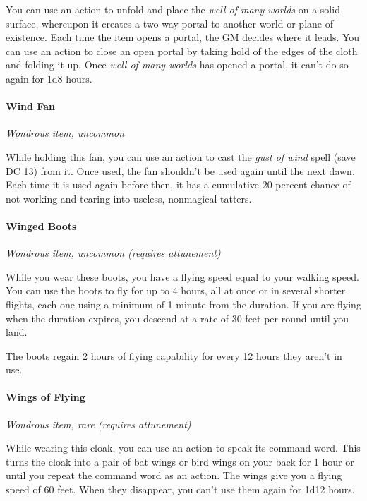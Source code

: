 \documentclass[
]{article}
\begin{document}
You can use an action to unfold and place the \emph{well of many worlds}
on a solid surface, whereupon it creates a two-way portal to another
world or plane of existence. Each time the item opens a portal, the GM
decides where it leads. You can use an action to close an open portal by
taking hold of the edges of the cloth and folding it up. Once \emph{well
of many worlds} has opened a portal, it can't do so again for 1d8 hours.

\hypertarget{wind-fan}{%
\paragraph{Wind Fan}\label{wind-fan}}

\emph{Wondrous item, uncommon}

While holding this fan, you can use an action to cast the \emph{gust of
wind} spell (save DC 13) from it. Once used, the fan shouldn't be used
again until the next dawn. Each time it is used again before then, it
has a cumulative 20 percent chance of not working and tearing into
useless, nonmagical tatters.

\hypertarget{winged-boots}{%
\paragraph{Winged Boots}\label{winged-boots}}

\emph{Wondrous item, uncommon (requires attunement)}

While you wear these boots, you have a flying speed equal to your
walking speed. You can use the boots to fly for up to 4 hours, all at
once or in several shorter flights, each one using a minimum of 1 minute
from the duration. If you are flying when the duration expires, you
descend at a rate of 30 feet per round until you land.

The boots regain 2 hours of flying capability for every 12 hours they
aren't in use.

\hypertarget{wings-of-flying}{%
\paragraph{Wings of Flying}\label{wings-of-flying}}

\emph{Wondrous item, rare (requires attunement)}

While wearing this cloak, you can use an action to speak its command
word. This turns the cloak into a pair of bat wings or bird wings on
your back for 1 hour or until you repeat the command word as an action.
The wings give you a flying speed of 60 feet. When they disappear, you
can't use them again for 1d12 hours.
\end{document}
